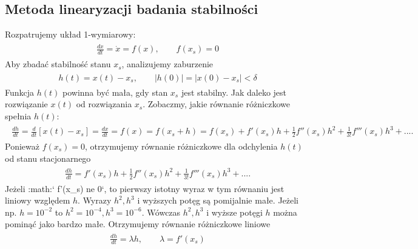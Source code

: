 \documentclass[a4paper,12pt,polish]{sphinxmanual}
\begin{document}
\subsection{Metoda linearyzacji badania stabilności}
\label{ch1/chI023:metoda-linearyzacji-badania-stabilnosci}
Rozpatrujemy układ 1-wymiarowy:
\label{ch1/chI023:equation-eqn10}\begin{gather}
\begin{split}\frac{dx}{dt} = \dot x = f(x), \quad \quad f(x_s) = 0\end{split}\label{ch1/chI023-eqn10}
\end{gather}
Aby zbadać stabilność stanu  $x_s$, analizujemy zaburzenie
\label{ch1/chI023:equation-eqn11}\begin{gather}
\begin{split}h(t) = x(t) - x_s,  \quad \quad  |h(0)| = |x(0) - x_s| < \delta\end{split}\label{ch1/chI023-eqn11}
\end{gather}
Funkcja $h(t)$ powinna być mała, gdy stan $x_s$ jest stabilny. Jak daleko jest rozwiązanie $x(t)$ od rozwiązania $x_s$. Zobaczmy, jakie równanie różniczkowe spełnia $h(t)$:
\label{ch1/chI023:equation-eqn12}\begin{gather}
\begin{split}\frac{dh}{dt} = \frac{d}{dt} [x(t) - x_s] = \frac{dx}{dt} = f(x) = f( x_s +h)  = f(x_s) + f'(x_s) h + \frac{1}{2} f''(x_s) h^2 + \frac{1}{3!} f'''(x_s) h^3+ ....\end{split}\label{ch1/chI023-eqn12}
\end{gather}
Ponieważ $f(x_s)=0$, otrzymujemy równanie różniczkowe dla odchylenia $h(t)$ od stanu stacjonarnego
\label{ch1/chI023:equation-eqn13}\begin{gather}
\begin{split}\frac{dh}{dt} =  f'(x_s) h + \frac{1}{2} f''(x_s) h^2 + \frac{1}{3!} f'''(x_s) h^3+ ....\end{split}\label{ch1/chI023-eqn13}
\end{gather}
Jeżeli :math:{}` f'(x\_s) ne 0{}`, to pierwszy istotny wyraz w tym równaniu jest liniowy względem $h$.  Wyrazy $h^2,  h^3$ i wyższych potęg są pomijalnie małe. Jeżeli np. $h =10^{-2}$ to  $h^2 = 10^{-4},  h^3 = 10^{-6}$. Wówczas $h^2,  h^3$ i wyższe potęgi $h$  można pominąć jako bardzo małe.  Otrzymujemy równanie różniczkowe liniowe
\label{ch1/chI023:equation-eqn14}\begin{gather}
\begin{split}\frac{dh}{dt} =\lambda h, \quad \quad \lambda = f'(x_s)\end{split}\label{ch1/chI023-eqn14}
\end{gather}
\end{document}
